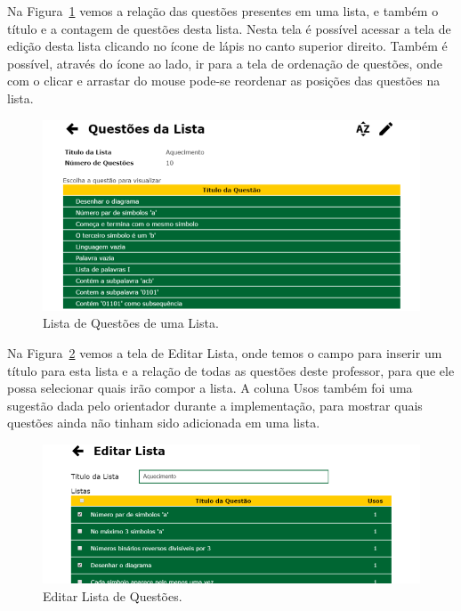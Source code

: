 \documentclass[
	12pt,				%
	openany,
	oneside,
	a4paper,			%
	english,			%
	brazil				%
	]{abntex2}
\begin{document}

  Na Figura~\ref{print:profListaDeQuestoes} vemos a relação das questões presentes em uma lista, e também o título e a contagem de questões desta lista. Nesta tela é possível acessar a tela de edição desta lista clicando no ícone de lápis no canto superior direito. Também é possível, através do ícone ao lado, ir para a tela de ordenação de questões, onde com o clicar e arrastar do mouse pode-se reordenar as posições das questões na lista.

\begin{figure}[H]
  \centering
  \includegraphics[width=\textwidth]{prints/profListaDeQuestoes.png}
  \caption{Lista de Questões de uma Lista.}
  \label{print:profListaDeQuestoes}
  \vspace{-0.5cm}
\end{figure}

  Na Figura~\ref{print:profEditarLista} vemos a tela de Editar Lista, onde temos o campo para inserir um título para esta lista e a relação de todas as questões deste professor, para que ele possa selecionar quais irão compor a lista. A coluna Usos também foi uma sugestão dada pelo orientador durante a implementação, para mostrar quais questões ainda não tinham sido adicionada em uma lista.

\begin{figure}[H]
  \centering
  \includegraphics[width=\textwidth]{prints/profEditarLista.png}
  \caption{Editar Lista de Questões.}
  \label{print:profEditarLista}
  \vspace{-0.5cm}
\end{figure}
\end{document}

